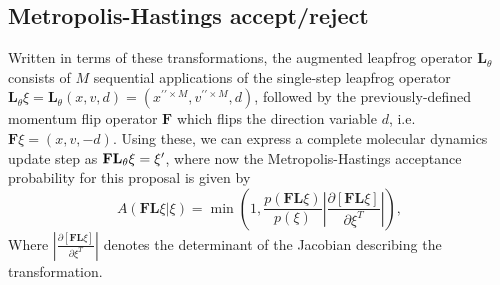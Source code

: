 \documentclass[../main.tex]{subfiles}
\begin{document}
\subsection{Metropolis-Hastings accept/reject}
%
Written in terms of these transformations, the augmented leapfrog operator $\mathbf{L}_{\theta}$ consists of $M$
sequential applications of the single-step leapfrog operator $\mathbf{L}_{\theta} \xi = \mathbf{L}_{\theta}(x, v, d) =
(x^{\prime\prime\times M}, v^{\prime\prime\times M}, d)$, followed by the previously-defined momentum flip operator
$\mathbf{F}$ which flips the direction variable $d$, i.e.\ $\mathbf{F}\xi = (x, v, -d)$.
%
Using these, we can express a complete molecular dynamics update step as $\mathbf{FL}_{\theta}\xi = {\xi^{\prime}}$, where now
the Metropolis-Hastings acceptance probability for this proposal is given by
%
\begin{equation}
    A(\mathbf{F}\mathbf{L} \xi | \xi) = \min\left(1,
        \frac{p(\mathbf{F}\mathbf{L}\xi)}{p(\xi)}\left|
        \frac{\partial\left[\mathbf{F}\mathbf{L}\xi\right]}
            {\partial\xi^{T}}\right|\right),
\end{equation}
%
Where $\left|\frac{\partial\left[\mathbf{F}\mathbf{L}\xi\right]} {\partial\xi^{T}}\right|$ denotes the determinant of
the Jacobian describing the transformation.
\end{document}

